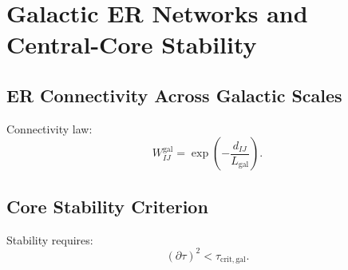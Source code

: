 \chapter{Galactic ER Networks and Central-Core Stability}

\section{ER Connectivity Across Galactic Scales}
Connectivity law:
\[
W_{IJ}^{\mathrm{gal}} = \exp\!\left(-\frac{d_{IJ}}{L_{\mathrm{gal}}}\right).
\]

\section{Core Stability Criterion}
Stability requires:
\[
(\partial\tau)^2 < \tau_{\mathrm{crit,gal}}.
\]

